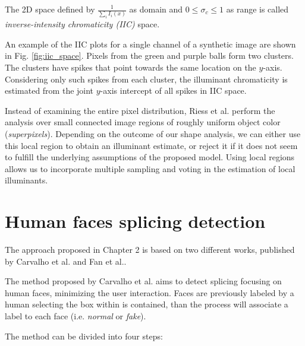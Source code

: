 The 2D space defined by $\frac{1}{\sum_{i} I_i(x)}$ as domain and $0 \leq \sigma_c \leq 1$ as range is called \emph{inverse-intensity chromaticity (IIC)} space.

An example of the IIC plots for a single channel of a synthetic image are shown in Fig. \ref{fig:iic_space}.
Pixels from the green and purple balls form two clusters. The clusters have spikes that point towards the same location on the $y$-axis. Considering only such spikes from each cluster, the illuminant chromaticity is estimated from the joint $y$-axis intercept of all spikes in IIC space.

Instead of examining the entire pixel distribution, Riess et al.\cite{riess2010scene} perform the analysis over small connected image regions of roughly uniform object color (\emph{superpixels}). Depending on the outcome of our shape analysis, we can either use this local region to obtain an illuminant estimate, or reject it if it does not seem to fulfill the underlying assumptions of the proposed model. Using local regions allows us to incorporate multiple sampling and voting in the estimation of local illuminants.

\section{Human faces splicing detection}

The approach proposed in Chapter 2 is based on two different works, published by Carvalho et al.\cite{carvalho2016illuminant} and Fan et al.\cite{fan2015image}.

The method proposed by Carvalho et al.\cite{carvalho2016illuminant} aims to detect splicing focusing on human faces, minimizing the user interaction. Faces are previously labeled by a human selecting the box within is contained, than the process will associate a label to each face (i.e. \emph{normal} or \emph{fake}).

The method can be divided into four steps:

